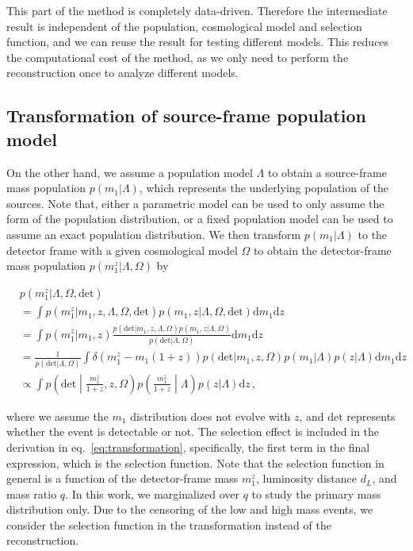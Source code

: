 \documentclass[aps,prd,twocolumn,superscriptaddress,preprintnumbers,nofootinbib,hidelinks]{revtex4-2}
\begin{document}
This part of the method is completely data-driven.
Therefore the intermediate result is independent of the population, cosmological model and selection function, and we can reuse the result for testing different models.
This reduces the computational cost of the method, as we only need to perform the reconstruction once to analyze different models.

\subsection{Transformation of source-frame population model}
\label{sec:transformation}

On the other hand, we assume a population model $\Lambda$ to obtain a source-frame mass population $p(m_1|\Lambda)$, which represents the underlying population of the sources.
Note that, either a parametric model can be used to only assume the form of the population distribution, or a fixed population model can be used to assume an exact population distribution.
We then transform $p(m_1|\Lambda)$ to the detector frame with a given cosmological model $\Omega$ to obtain the detector-frame mass population $p(m^z_1|\Lambda, \Omega)$ by
\begin{widetext}
\begin{equation}
    \label{eq:transformation}
    \begin{aligned}
        &p(m^z_1|\Lambda, \Omega, \mathrm{det}) \\
        &= \int p(m^z_1|m_1, z, \Lambda, \Omega, \mathrm{det}) p(m_1, z|\Lambda, \Omega, \mathrm{det}) \mathrm{d}m_1 \mathrm{d}z \\
        &= \int p(m^z_1|m_1, z) \frac{p(\mathrm{det}|m_1, z, \Lambda, \Omega)p(m_1, z|\Lambda, \Omega)}{p(\mathrm{det}|\Lambda, \Omega)} \mathrm{d}m_1 \mathrm{d}z \\
        &= \frac{1}{p(\mathrm{det}|\Lambda, \Omega)}\int \delta(m^z_1-m_1(1+z))p(\mathrm{det}|m_1, z, \Omega)p(m_1|\Lambda)p(z|\Lambda) \mathrm{d}m_1 \mathrm{d}z \\
        &\propto \int p\left(\mathrm{det}\middle|\frac{m^z_1}{1+z},z,\Omega\right)p\left(\frac{m^z_1}{1+z}\middle|\Lambda\right)p(z|\Lambda) \mathrm{d}z\,,
    \end{aligned}
\end{equation}
\end{widetext}
where we assume the $m_1$ distribution does not evolve with $z$, and $\mathrm{det}$ represents whether the event is detectable or not.
The selection effect is included in the derivation in eq.~\eqref{eq:transformation}, specifically, the first term in the final expression, which is the selection function.
Note that the selection function in general is a function of the detector-frame mass $m^z_1$, luminosity distance $d_L$, and mass ratio $q$.
In this work, we marginalized over $q$ to study the primary mass distribution only.
Due to the censoring of the low and high mass events, we consider the selection function in the transformation instead of the reconstruction.
\end{document}
